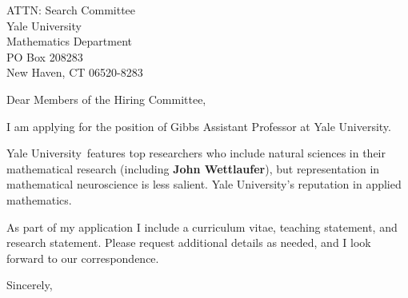 \documentclass[11pt,a4paper]{letter}
\begin{document}

\def\School{Yale University}

\begin{letter}
{ATTN: Search Committee\\
Yale University\\
Mathematics Department\\
PO Box 208283\\
New Haven, CT 06520-8283}


\opening{Dear Members of the Hiring Committee,}

I am applying for the position of Gibbs Assistant Professor at \School. 



\School~features top researchers who include natural sciences in their mathematical research (including \textbf{John Wettlaufer}), but representation in mathematical neuroscience is less salient. \School's reputation in applied mathematics.



As part of my application I include a curriculum vitae, teaching statement, and research statement. Please request additional details as needed, and I look forward to our correspondence.

\closing{Sincerely,}
\end{letter}
\end{document}
